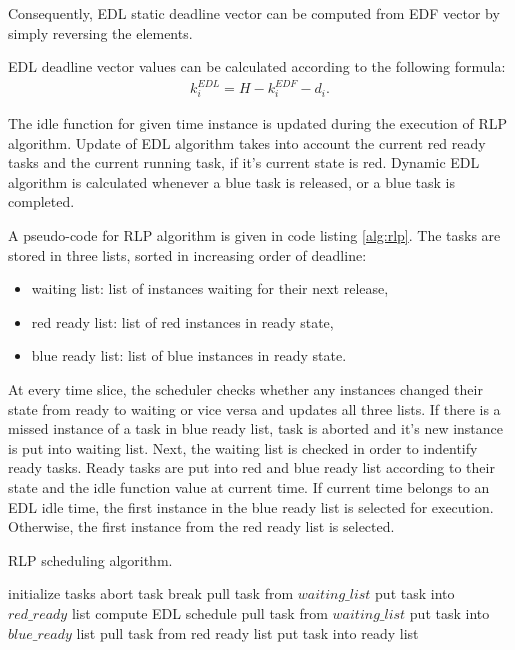 Consequently, EDL static deadline vector can be computed from EDF vector by simply reversing the elements.

EDL deadline vector values can be calculated according to the following formula:
\begin{align}
k_i^{EDL} = H - k_i^{EDF} - d_i.
\end{align} 

The idle function for given time instance is updated during the execution of RLP algorithm. 
Update of EDL algorithm takes into account the current red ready tasks and the current running task, if it's current state is red. 
Dynamic EDL algorithm is calculated whenever a blue task is released, or a blue task is completed. 

A pseudo-code for RLP algorithm is given in code listing \ref{alg:rlp}.
The tasks are stored in three lists, sorted in increasing order of deadline: 
\begin{itemize}
	\item{waiting list: list of instances waiting for their next release,}
	\item{red ready list: list of red instances in ready state,}
	\item{blue ready list: list of blue instances in ready state.}
\end{itemize}
At every time slice, the scheduler checks whether any instances changed their state from ready to waiting or vice versa and updates all three lists. 
If there is a missed instance of a task in blue ready list, task is aborted and it's new instance is put into waiting list. 
Next, the waiting list is checked in order to indentify ready tasks. 
Ready tasks are put into red and blue ready list according to their state and the idle function value at current time. 
If current time belongs to an EDL idle time, the first instance in the blue ready list is selected for execution. Otherwise, the first instance from the red ready list is selected.

\begin{algorithm}
\caption{RLP scheduling algorithm.\label{alg:rlp}}
\begin{algorithmic}
\STATE initialize tasks
\STATE abort task
\ENDIF
\ENDFOR
{}
\STATE break
\ENDIF
{}
\STATE pull task from $waiting\_list$
\STATE put task into $red\_ready$ list
\ELSE
{}
\STATE compute EDL schedule
\ENDIF
{}
\STATE pull task from $waiting\_list$
\STATE put task into $blue\_ready$ list
\ENDIF
\ENDIF
\ENDFOR
{}
\STATE pull task from red ready list
\STATE put task into ready list
\ENDFOR
\ENDIF
\end{algorithmic}
\end{algorithm}

